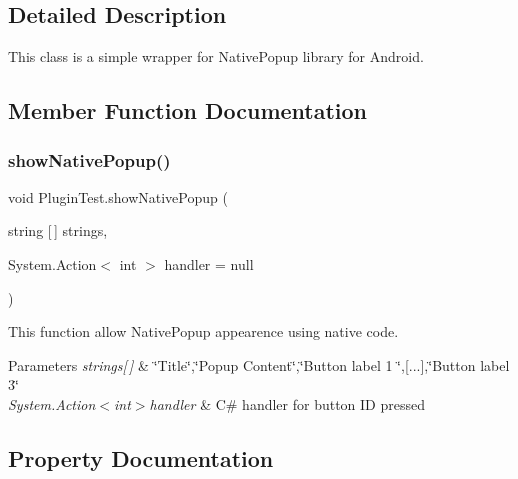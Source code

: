 \subsection{Detailed Description}
This class is a simple wrapper for Native\+Popup library for Android. 

\subsection{Member Function Documentation}
\mbox{\label{class_plugin_test_a33a2f4883cdfbb97570fa67a69d15e6c}} 
\subsubsection{\texorpdfstring{show\+Native\+Popup()}{showNativePopup()}}
{\footnotesize\ttfamily void Plugin\+Test.\+show\+Native\+Popup (\begin{DoxyParamCaption}\item[{string \mbox{[}$\,$\mbox{]}}]{strings,  }\item[{System.\+Action$<$ int $>$}]{handler = {\ttfamily null} }\end{DoxyParamCaption})}



This function allow Native\+Popup appearence using native code. 


\begin{DoxyParams}{Parameters}
{\em strings\mbox{[}$\,$\mbox{]}} & \char`\"{}\+Title\char`\"{},\char`\"{}\+Popup Content\char`\"{},\char`\"{}\+Button label 1 \char`\"{},\mbox{[}...\mbox{]},\char`\"{}\+Button label 3\char`\"{} \\
\hline
{\em System.\+Action$<$int$>$handler} & C\# handler for button ID pressed \\
\hline
\end{DoxyParams}


\subsection{Property Documentation}
\mbox{\label{class_plugin_test_af0c0706dc0b8b8cf2dd3f834b8c99e5d}} 
